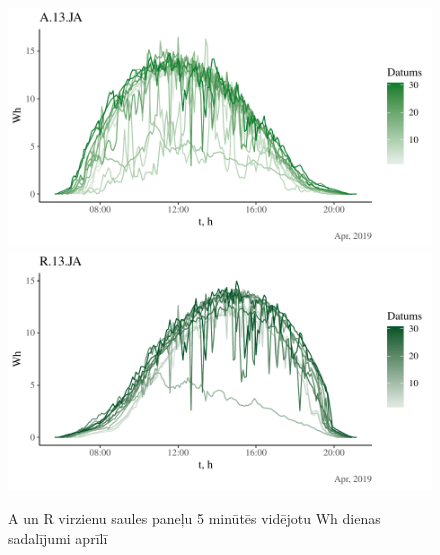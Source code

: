 \begin{figure}[h]
    \centering
    \includegraphics[width=\linewidth]{figures/sol_day/apr_A13JA.pdf}
    \includegraphics[width=\linewidth]{figures/sol_day/apr_R13JA.pdf}
    \caption{A un R virzienu saules paneļu 5 minūtēs vidējotu Wh dienas sadalījumi aprīlī}
    \label{fig:apr_ar}
\end{figure}



